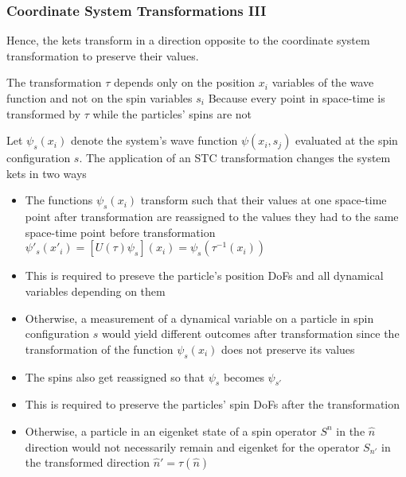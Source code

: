 \documentclass[8pt,t,mathserif,aspectratio=169]{beamer}
\begin{document}
\begin{frame}
  \frametitle{Coordinate System Transformations III}
  \vspace{1mm}
  Hence, the kets transform in a direction opposite to the coordinate system transformation to preserve their values.

  The transformation $\tau$ depends only on the position $x_i$ variables of the wave function and not on the spin variables $s_i$ Because every point in space-time is transformed by $\tau$ while the particles' spins are not

  Let $\psi_s(x_i)$ denote the system's wave function $\psi(x_i,s_j)$ evaluated at the spin configuration $s$. The application of an STC transformation changes the system kets in two ways
  \begin{itemize}
    \item The functions $\psi_s(x_i)$ transform such that their values at one space-time point after transformation are reassigned to the values they had to the same space-time point before transformation $\psi'_s(x'_i) = [U(\tau) \psi_s](x_i) = \psi_s(\tau^{-1}(x_i))$
    \item This is required to preseve the particle's position DoFs and all dynamical variables depending on them
    \item Otherwise, a measurement of a dynamical variable on a particle in spin configuration $s$ would yield different outcomes after transformation since the transformation of the function $\psi_s(x_i)$ does not preserve its values
    \item The spins also get reassigned so that $\psi_s$ becomes $\psi_{s'}$
    \item This is required to preserve the particles' spin DoFs after the transformation 
    \item Otherwise, a particle in an eigenket state of a spin operator $S^n$ in the $\hat{n}$ direction would not necessarily remain and eigenket for the operator $S_{n'}$ in the transformed direction $\hat{n}' = \tau(\hat{n})$
  \end{itemize}
\end{frame}
\end{document}
